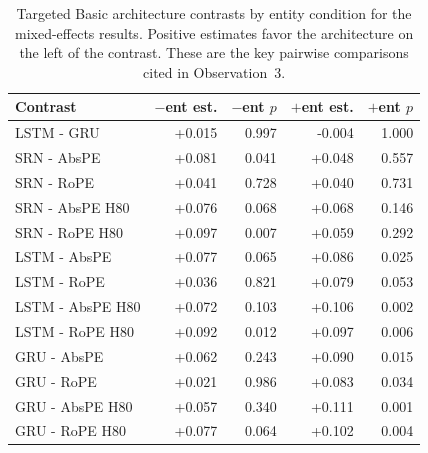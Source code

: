 \begin{table}[t]
\centering\scriptsize
\begin{tabular}{@{}lrrrr@{}}
\toprule
\textbf{Contrast} & \textbf{$-$ent est.} & \textbf{$-$ent $p$} & \textbf{$+$ent est.} & \textbf{$+$ent $p$} \\
\midrule
LSTM - GRU & +0.015 & 0.997 & -0.004 & 1.000 \\
SRN - AbsPE & +0.081 & 0.041 & +0.048 & 0.557 \\
SRN - RoPE & +0.041 & 0.728 & +0.040 & 0.731 \\
SRN - AbsPE H80 & +0.076 & 0.068 & +0.068 & 0.146 \\
SRN - RoPE H80 & +0.097 & 0.007 & +0.059 & 0.292 \\
LSTM - AbsPE & +0.077 & 0.065 & +0.086 & 0.025 \\
LSTM - RoPE & +0.036 & 0.821 & +0.079 & 0.053 \\
LSTM - AbsPE H80 & +0.072 & 0.103 & +0.106 & 0.002 \\
LSTM - RoPE H80 & +0.092 & 0.012 & +0.097 & 0.006 \\
GRU - AbsPE & +0.062 & 0.243 & +0.090 & 0.015 \\
GRU - RoPE & +0.021 & 0.986 & +0.083 & 0.034 \\
GRU - AbsPE H80 & +0.057 & 0.340 & +0.111 & 0.001 \\
GRU - RoPE H80 & +0.077 & 0.064 & +0.102 & 0.004 \\
\bottomrule
\end{tabular}
\caption{\small Targeted Basic architecture contrasts by entity condition for the mixed-effects results. Positive estimates favor the architecture on the left of the contrast. These are the key pairwise comparisons cited in Observation~3.}
\label{tab:basic_event_arch_by_entity}
\end{table}
